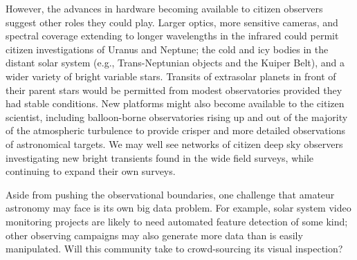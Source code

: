 \documentclass{ar2e}
\begin{document}


However, the advances in hardware becoming available to citizen observers
suggest other roles they could play. Larger optics, more sensitive cameras,
and spectral coverage extending to longer wavelengths in the infrared could
permit citizen investigations of Uranus and Neptune; the cold and icy bodies
in the distant solar system (e.g., Trans-Neptunian objects and the Kuiper
Belt), and a wider variety of bright variable stars.  Transits of extrasolar
planets in front of their parent stars would be permitted from modest
observatories provided they had stable conditions.  New platforms might also
become available to the citizen scientist, including balloon-borne
observatories rising up and out of the majority of the atmospheric turbulence
to provide crisper and more detailed observations of astronomical targets. We
may well see networks of citizen deep sky observers investigating new bright
transients found in the wide field surveys,  while
continuing to expand their own surveys.

Aside from pushing the observational boundaries, one challenge that amateur
astronomy may face is its own big data problem.   For example, solar system
video monitoring projects are likely to need automated feature detection of some
kind; other observing campaigns may also generate more data than is easily
manipulated. Will this community take to crowd-sourcing its visual inspection?





% 
\end{document}
